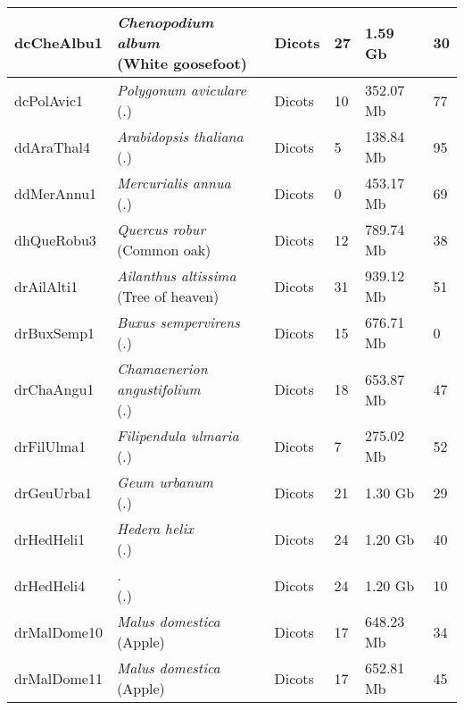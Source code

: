 \begin{centering}
\begin{longtable}{l|l|l|l|l|l}
dcCheAlbu1 & \makecell[{l}]{\textit{Chenopodium album} \\ (White goosefoot)} & Dicots & 27 & 1.59 Gb & 30  \\ \hline
dcPolAvic1 & \makecell[{l}]{\textit{Polygonum aviculare} \\ (.)} & Dicots & 10 & 352.07 Mb & 77  \\ \hline
ddAraThal4 & \makecell[{l}]{\textit{Arabidopsis thaliana} \\ (.)} & Dicots & 5 & 138.84 Mb & 95  \\ \hline
ddMerAnnu1 & \makecell[{l}]{\textit{Mercurialis annua} \\ (.)} & Dicots & 0 & 453.17 Mb & 69  \\ \hline
dhQueRobu3 & \makecell[{l}]{\textit{Quercus robur} \\ (Common oak)} & Dicots & 12 & 789.74 Mb & 38  \\ \hline
drAilAlti1 & \makecell[{l}]{\textit{Ailanthus altissima} \\ (Tree of heaven)} & Dicots & 31 & 939.12 Mb & 51  \\ \hline
drBuxSemp1 & \makecell[{l}]{\textit{Buxus sempervirens} \\ (.)} & Dicots & 15 & 676.71 Mb & 0  \\ \hline
drChaAngu1 & \makecell[{l}]{\textit{Chamaenerion angustifolium} \\ (.)} & Dicots & 18 & 653.87 Mb & 47  \\ \hline
drFilUlma1 & \makecell[{l}]{\textit{Filipendula ulmaria} \\ (.)} & Dicots & 7 & 275.02 Mb & 52  \\ \hline
drGeuUrba1 & \makecell[{l}]{\textit{Geum urbanum} \\ (.)} & Dicots & 21 & 1.30 Gb & 29  \\ \hline
drHedHeli1 & \makecell[{l}]{\textit{Hedera helix} \\ (.)} & Dicots & 24 & 1.20 Gb & 40  \\ \hline
drHedHeli4 & \makecell[{l}]{\textit{.} \\ (.)} & Dicots & 24 & 1.20 Gb & 10  \\ \hline
drMalDome10 & \makecell[{l}]{\textit{Malus domestica} \\ (Apple)} & Dicots & 17 & 648.23 Mb & 34  \\ \hline
drMalDome11 & \makecell[{l}]{\textit{Malus domestica} \\ (Apple)} & Dicots & 17 & 652.81 Mb & 45  \\ \hline

\end{longtable}
\end{centering}
